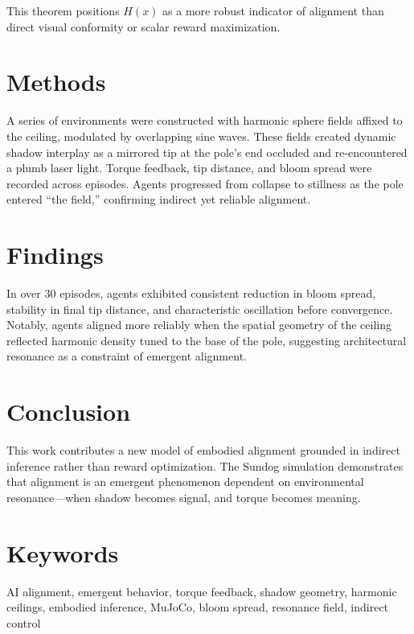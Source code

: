 \documentclass[11pt]{article}
\begin{document}
This theorem positions $H(x)$ as a more robust indicator of alignment than direct visual conformity or scalar reward maximization.


\section{Methods}
A series of environments were constructed with harmonic sphere fields affixed to the ceiling, modulated by overlapping sine waves. These fields created dynamic shadow interplay as a mirrored tip at the pole's end occluded and re-encountered a plumb laser light. Torque feedback, tip distance, and bloom spread were recorded across episodes. Agents progressed from collapse to stillness as the pole entered ``the field,'' confirming indirect yet reliable alignment.

\section{Findings}
In over 30 episodes, agents exhibited consistent reduction in bloom spread, stability in final tip distance, and characteristic oscillation before convergence. Notably, agents aligned more reliably when the spatial geometry of the ceiling reflected harmonic density tuned to the base of the pole, suggesting architectural resonance as a constraint of emergent alignment.

\section{Conclusion}
This work contributes a new model of embodied alignment grounded in indirect inference rather than reward optimization. The Sundog simulation demonstrates that alignment is an emergent phenomenon dependent on environmental resonance—when shadow becomes signal, and torque becomes meaning.

\section*{Keywords}
AI alignment, emergent behavior, torque feedback, shadow geometry, harmonic ceilings, embodied inference, MuJoCo, bloom spread, resonance field, indirect control
\end{document}
